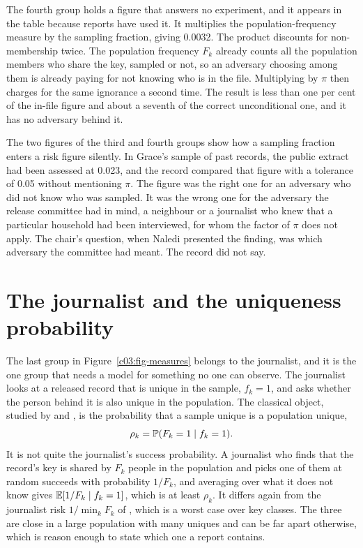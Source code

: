 The fourth group holds a figure that answers no experiment, and it appears in the table
because reports have used it. It multiplies the population-frequency measure by the
sampling fraction, giving 0.0032.
The product discounts for non-membership twice. The population frequency $F_k$ already
counts all the population members who share the key, sampled or not, so an adversary
choosing among them is already paying for not knowing who is in the file. Multiplying
by $\pi$ then charges for the same ignorance a second time. The result is less than one
per cent of the in-file figure and about a seventh of the correct unconditional one,
and it has no adversary behind it.

The two figures of the third and fourth groups show how a sampling fraction enters a
risk figure silently. In Grace's sample of past records, the public extract had been
assessed at 0.023, and the record compared that figure with a tolerance of 0.05 without
mentioning $\pi$. The figure was the right one for an adversary who did not know who was
sampled. It was the wrong one for the adversary the release committee had in mind, a
neighbour or a journalist who knew that a particular household had been interviewed,
for whom the factor of $\pi$ does not apply. The chair's question, when Naledi presented
the finding, was which adversary the committee had meant. The record did not say.

\section{The journalist and the uniqueness probability}

The last group in Figure~\ref{c03:fig-measures} belongs to the journalist, and it is
the one group that needs a model for something no one can observe. The journalist looks
at a released record that is unique in the sample, $f_k = 1$, and asks whether the
person behind it is also unique in the population. The classical object, studied by
\citet{skinnerholmes1998} and \citet{skinner2002}, is the probability that a sample
unique is a population unique,
\begin{equation}\label{c03:eq-rhodef}
\rho_k = \mathbb{P}(F_k = 1 \mid f_k = 1).
\end{equation}
It is not quite the journalist's success probability. A journalist who finds that the
record's key is shared by $F_k$ people in the population and picks one of them at random
succeeds with probability $1/F_k$, and averaging over what it does not know gives
$\mathbb{E}[1/F_k \mid f_k = 1]$, which is at least $\rho_k$. It differs again from the
journalist risk $1/\min_k F_k$ of \citet{elemam2008}, which is a worst case over key
classes. The three are close in a large population with many uniques and can be far
apart otherwise, which is reason enough to state which one a report contains.

